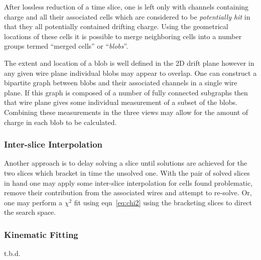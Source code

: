 \documentclass[letter]{article}
\begin{document}
After lossless reduction of a time slice, one is left only with
channels containing charge and all their associated cells which are
considered to be \textit{potentially hit} in that they all potentially
contained drifting charge.
Using the geometrical locations of these cells it is possible to merge
neighboring cells into a number groups termed ``merged cells'' or
``\textit{blobs}''.

The extent and location of a blob is well defined in the 2D drift
plane however in any given wire plane individual blobs may appear to
overlap.
One can construct a bipartite graph between blobs and their associated
channels in a single wire plane.
If this graph is composed of a number of fully connected subgraphs
then that wire plane gives some individual measurement of a subset of
the blobs.
Combining these measurements in the three views may allow for the
amount of charge in each blob to be calculated.


\subsubsection{Inter-slice Interpolation}

Another approach is to delay solving a slice until solutions are
achieved for the two slices which
bracket in time the unsolved one.
With the pair of solved slices in hand one may apply some inter-slice
interpolation for cells found problematic, remove their contribution
from the associated wires and attempt to re-solve.
Or, one may perform a $\chi^2$ fit using eqn~\ref{eq:chi2} using the
bracketing slices to direct the search space. 

\subsubsection{Kinematic Fitting}
t.b.d.
\end{document}
